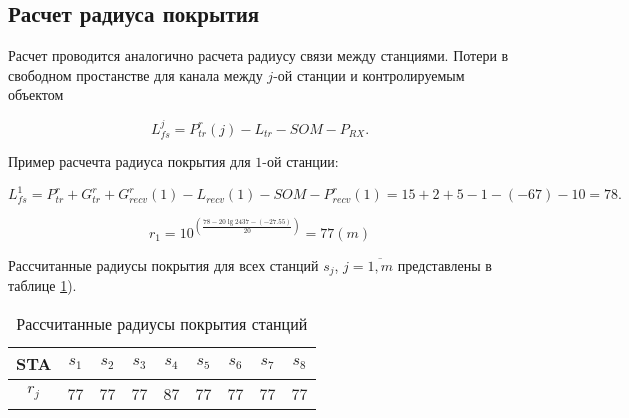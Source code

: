 \subsection{Расчет радиуса покрытия}



Расчет проводится аналогично расчета радиусу связи между станциями. 
Потери в свободном простанстве для канала между $j$-ой станции и контролируемым объектом

\begin{displaymath}
  L_{fs}^{j} = P_{tr}^r(j) - L_{tr}  - SOM - P_{RX}. 
\end{displaymath}


Пример расчечта радиуса покрытия для  $1$-ой станции:

\begin{displaymath}
  L_{fs}^{1} = P_{tr}^r + G_{tr}^r + G_{recv}^r(1) - L_{recv}(1)  - SOM - P_{recv}^r(1) = 15+2+5-1-(-67)-10 = 78 .
\end{displaymath}

\begin{displaymath}
  r_{1} = 10^{\left(\frac{78 - 20\lg{2437} - (-27.55)}{20}\right)} = 77 (m)
\end{displaymath}


Рассчитанные радиусы покрытия для всех станций $ s_j $, $ j = \overline{1, m} $ представлены в таблице \cref{tab:part3_rj}).

\begin{table}[h!]\begin{center}
  \begin{tabular}{|c||c|c|c|c|c|c|c|c|}\hline
      STA & $s_1$ & $s_2$ & $s_3$ & $s_4$ & $s_5$ & $s_6$ & $s_7$ & $s_8$\\ \hline \hline

      $r_{j}$ & 77 & 77 & 77 & 87 & 77 & 77 & 77 & 77\\ \hline

\end{tabular}\caption{Рассчитанные радиусы покрытия станций}\label{tab:part3_rj}
\end{center}\end{table}

